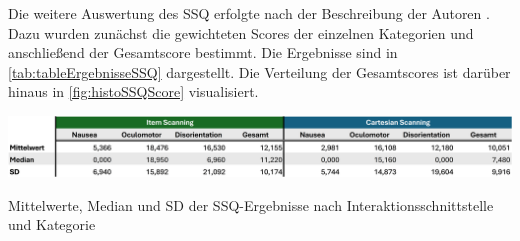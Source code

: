 Die weitere Auswertung des SSQ erfolgte nach der Beschreibung der Autoren \citep{kennedy_simulator_1993}. Dazu wurden zunächst die gewichteten Scores der einzelnen Kategorien und anschließend der Gesamtscore bestimmt. Die Ergebnisse sind in \autoref{tab:tableErgebnisseSSQ} dargestellt. Die Verteilung der Gesamtscores ist darüber hinaus in \autoref{fig:histoSSQScore} visualisiert. 

\begin{table}[tbh]
    \centering
    \includegraphics[width=1.0\textwidth]{images/Results/Tabelle-Ergebnisse-SSQ.png}
    \caption{Mittelwerte, Median und SD der SSQ-Ergebnisse nach Interaktionsschnittstelle und Kategorie}
    \label{tab:tableErgebnisseSSQ}
\end{table}

